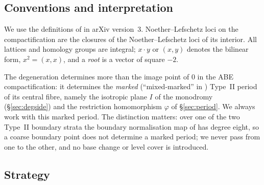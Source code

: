 \documentclass[11pt]{article}
\theoremstyle{definition}
\theoremstyle{remark}
\begin{document}
\subsection{Conventions and interpretation}\label{sec:conventions}

We use the definitions of \cite{GT} in arXiv version~3.
Noether--Lefschetz loci on the compactification are the closures of
the Noether--Lefschetz loci of its interior. All lattices and homology
groups are integral; \(x\cdot y\) or \((x,y)\) denotes the bilinear
form, \(x^2=(x,x)\), and a \emph{root} is a vector of square \(-2\).

The degeneration determines more than the image point of \(0\) in the
ABE compactification: it determines the \emph{marked} (``mixed-marked''
in \cite{AE}) Type~II period of its central fibre, namely the isotropic
plane \(I\) of the monodromy (\S\ref{sec:degside}) and the restriction
homomorphism \(\varphi\) of \S\ref{sec:period}. We always work with
this marked period. The distinction matters: over one of the two
Type~II boundary strata the boundary normalisation map of
\cite[Theorem~7.58]{ABE} has degree eight, so a coarse boundary point
does not determine a marked period; we never pass from one to the
other, and no base change or level cover is introduced.

\subsection{Strategy}\label{sec:strategy}
\end{document}
